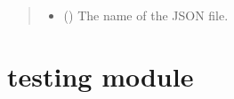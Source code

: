 \documentclass[letterpaper,10pt,english,openany,oneside]{sphinxmanual}
\begin{document}
\begin{fulllineitems}
\begin{fulllineitems}
\begin{quote}
\begin{description}
\begin{itemize}
\item {} 
\sphinxAtStartPar
{} () \textendash{} The name of the JSON file.

\end{itemize}

\end{description}\end{quote}

\end{fulllineitems}


\end{fulllineitems}


\sphinxstepscope


\section{testing module}
\label{\detokenize{testing:module-testing}}\label{\detokenize{testing:testing-module}}\label{\detokenize{testing::doc}}
\end{document}
